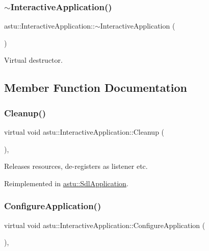\subsubsection{\texorpdfstring{$\sim$\+Interactive\+Application()}{~InteractiveApplication()}}
{\footnotesize\ttfamily astu\+::\+Interactive\+Application\+::$\sim$\+Interactive\+Application (\begin{DoxyParamCaption}{ }\end{DoxyParamCaption})\hspace{0.3cm}{\ttfamily [inline]}}

Virtual destructor. 

\subsection{Member Function Documentation}
\mbox{\label{classastu_1_1InteractiveApplication_a70f5e175ae42b4063358db3787db6bab}} 
\subsubsection{\texorpdfstring{Cleanup()}{Cleanup()}}
{\footnotesize\ttfamily virtual void astu\+::\+Interactive\+Application\+::\+Cleanup (\begin{DoxyParamCaption}{ }\end{DoxyParamCaption})\hspace{0.3cm}{\ttfamily [protected]}, {\ttfamily [virtual]}}

Releases resources, de-\/registers as listener etc. 

Reimplemented in \hyperlink{classastu_1_1SdlApplication_adbe5cb831451f65b635d37f57bacef3f}{astu\+::\+Sdl\+Application}.

\mbox{\label{classastu_1_1InteractiveApplication_abec13f308f2a707764a322ecd1bba42d}} 
\subsubsection{\texorpdfstring{Configure\+Application()}{ConfigureApplication()}}
{\footnotesize\ttfamily virtual void astu\+::\+Interactive\+Application\+::\+Configure\+Application (\begin{DoxyParamCaption}{ }\end{DoxyParamCaption})\hspace{0.3cm}{\ttfamily [protected]}, {\ttfamily [virtual]}}

